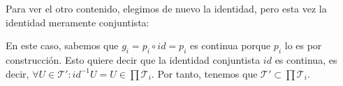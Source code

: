 \begin{demo}
\begin{enumerate}
    Para ver el otro contenido, elegimos de nuevo la identidad, pero esta vez la identidad meramente conjuntista:
    \begin{figure}[H]
        \centering    
    \end{figure}
   En este caso, sabemos que $g_i = p_i \circ id = p_i$ es continua porque $p_i$ lo es por construcción. Esto quiere decir que la identidad conjuntista $id$ es continua, es decir, $\forall U \in \mathcal{T}' : id^{-1} U = U \in \prod \mathcal{T}_i$. Por tanto, tenemos que $\mathcal{T}' \subset \prod \mathcal{T}_i$.
\end{enumerate}
\end{demo}

